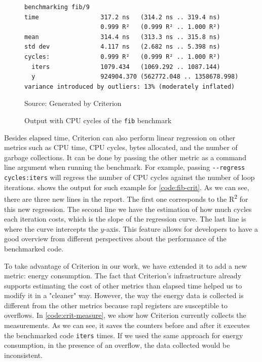 \begin{figure}[htp]
  \centering
  \caption{Output with CPU cycles of the \texttt{fib} benchmark}
  \begin{verbatim}
benchmarking fib/9
time                 317.2 ns   (314.2 ns .. 319.4 ns)
                     0.999 R²   (0.999 R² .. 1.000 R²)
mean                 314.4 ns   (313.3 ns .. 315.8 ns)
std dev              4.117 ns   (2.682 ns .. 5.398 ns)
cycles:              0.999 R²   (0.999 R² .. 1.000 R²)
  iters              1079.434   (1069.292 .. 1087.144)
  y                  924904.370 (562772.048 .. 1358678.998)
variance introduced by outliers: 13% (moderately inflated)
  \end{verbatim}
  \footnotesize{Source: Generated by Criterion}
  \label{fig:fib-cycle-output}
\end{figure}

Besides elapsed time, Criterion can also perform linear regression on other metrics such as CPU time, CPU cycles, bytes allocated, and the number of garbage collections. It can be done by passing the other metric as a command line argument when running the benchmark. For example, passing \texttt{-{}-regress cycles:iters} will regress the number of CPU cycles against the number of loop iterations.  shows the output for such example for \autoref{code:fib-crit}. As we can see, there are three new lines in the report. The first one corresponds to the R\textsuperscript{2} for this new regression. The second line we have the estimation of how much cycles each iteration costs, which is the slope of the regression curve. The last line is where the curve intercepts the $y$-axis. This feature allows for developers to have a good overview from different perspectives about the performance of the benchmarked code.

To take advantage of Criterion in our work, we have extended it to add a new metric: energy consumption. The fact that Criterion's infrastructure already supports estimating the cost of other metrics than elapsed time helped us to modify it in a "cleaner" way. However, the way the energy data is collected is different from the other metrics because \ac{rapl} registers are susceptible to overflows. In \autoref{code:crit-measure}, we show how Criterion currently collects the measurements. As we can see, it saves the counters before and after it executes the benchmarked code \texttt{iters} times. If we used the same approach for energy consumption, in the presence of an overflow, the data collected would be inconsistent.


